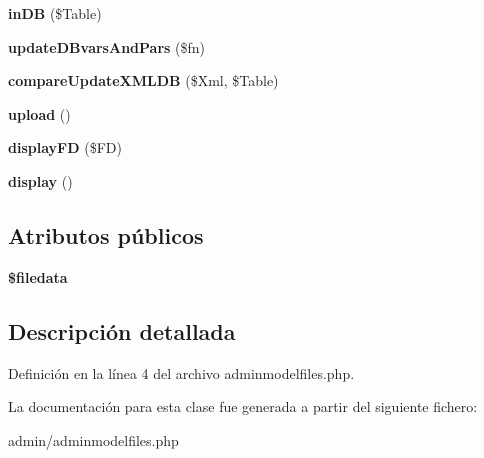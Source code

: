 \begin{DoxyCompactItemize}
\item 
\hypertarget{classadminmodelfiles_a9bed418a7e4ae7f28480ab6cf9767ea7}{{\bfseries in\-D\-B} (\$\-Table)}\label{classadminmodelfiles_a9bed418a7e4ae7f28480ab6cf9767ea7}

\item 
\hypertarget{classadminmodelfiles_a9ded5ca54c1ed7fe34cc831224576918}{{\bfseries update\-D\-Bvars\-And\-Pars} (\$fn)}\label{classadminmodelfiles_a9ded5ca54c1ed7fe34cc831224576918}

\item 
\hypertarget{classadminmodelfiles_aa36b9b08512d363174d08c8711576c3a}{{\bfseries compare\-Update\-X\-M\-L\-D\-B} (\$\-Xml, \$\-Table)}\label{classadminmodelfiles_aa36b9b08512d363174d08c8711576c3a}

\item 
\hypertarget{classadminmodelfiles_a75b3c881bbfa514acd88bc32597cba84}{{\bfseries upload} ()}\label{classadminmodelfiles_a75b3c881bbfa514acd88bc32597cba84}

\item 
\hypertarget{classadminmodelfiles_acd1759b4b15d819f14316280f3f87c29}{{\bfseries display\-F\-D} (\$\-F\-D)}\label{classadminmodelfiles_acd1759b4b15d819f14316280f3f87c29}

\item 
\hypertarget{classadminmodelfiles_a9aeb4f143fd7967234ac65e070baff8a}{{\bfseries display} ()}\label{classadminmodelfiles_a9aeb4f143fd7967234ac65e070baff8a}

\end{DoxyCompactItemize}
\subsection*{\-Atributos públicos}
\begin{DoxyCompactItemize}
\item 
\hypertarget{classadminmodelfiles_ac58f67d34dfa2c233883023b3787ead0}{{\bfseries \$filedata}}\label{classadminmodelfiles_ac58f67d34dfa2c233883023b3787ead0}

\end{DoxyCompactItemize}


\subsection{\-Descripción detallada}


\-Definición en la línea 4 del archivo adminmodelfiles.\-php.



\-La documentación para esta clase fue generada a partir del siguiente fichero\-:\begin{DoxyCompactItemize}
\item 
admin/adminmodelfiles.\-php\end{DoxyCompactItemize}
